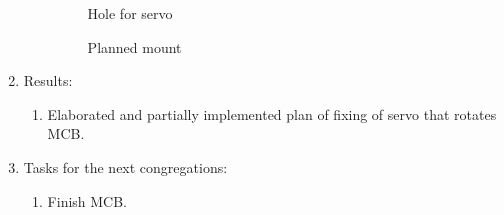\begin{enumerate}
\begin{enumerate}
\begin{figure}[H]
\begin{minipage}[h]{0.31\linewidth}
      		\caption{Hole for servo}
      	\end{minipage}
      	\hfill
      	\begin{minipage}[h]{0.31\linewidth}
      		\caption{Planned mount}
      	\end{minipage}
      \end{figure}
      
    \end{enumerate}
    
	\item Results: 
	\begin{enumerate}
	  \item Elaborated and partially implemented plan of fixing of servo that rotates MCB.  
	  
    \end{enumerate}
    
	\item Tasks for the next congregations:
	\begin{enumerate}
	  \item Finish MCB.
	  
    \end{enumerate}     
\end{enumerate}
\fillpage
